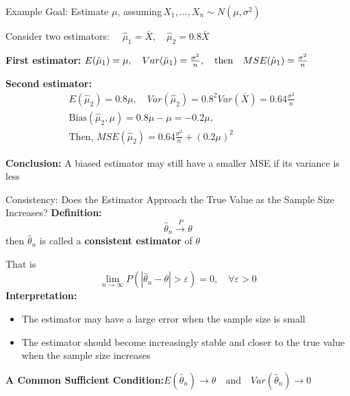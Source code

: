 \documentclass[aspectratio=169,12pt]{beamer}
\begin{document}
\begin{frame}{Example}
    Goal: Estimate $\mu$, assuming\,$X_1, \dots,X_n \sim N(\mu, \sigma^2)$

    \vspace{0.5em}
    Consider two estimators: $\quad\hat{\mu}_1=\bar X, \quad\hat{\mu}_2=0.8\bar X$

    \vspace{0.5em}
    \textbf{First estimator:} $E(\hat{\mu}_1)=\mu, \quad Var(\hat{\mu}_1)=\frac{\sigma^2}{n}, \quad\text{then\quad} MSE(\hat{\mu}_1)=\frac{\sigma^2}{n}$

    \vspace{0.5em}
    \textbf{Second estimator:}
    \vspace{-0.8em}
    \begin{align*}
    &E(\hat{\mu}_2)=0.8\mu, \quad Var(\hat{\mu}_2)=0.8^2 Var(\bar X)=0.64\frac{\sigma^2}{n}\\
    &\mathrm{Bias}(\hat{\mu}_2, \mu)=0.8\mu-\mu=-0.2\mu, \\
    &\text{Then},\,  MSE(\hat{\mu}_2)=0.64\frac{\sigma^2}{n}+(0.2\mu)^2
    \end{align*}

    \textbf{Conclusion:}
    A biased estimator may still have a smaller MSE if its variance is less
\end{frame}

\begin{frame}{Consistency: Does the Estimator Approach the True Value as the Sample Size Increases?}
    \textbf{Definition:}
    $$\hat{\theta}_n \xrightarrow{P} \theta$$
    then $\hat{\theta}_n$ is called a \textbf{consistent estimator} of $\theta$

    \vspace{0.8em}
    That is
    \vspace{-1.2em}
    $$\lim_{n\to\infty} P(|\hat{\theta}_n-\theta|>\varepsilon)=0,\quad \forall \varepsilon>0$$
    \textbf{Interpretation:}
    \begin{itemize}
        \item The estimator may have a large error when the sample size is small
        \item The estimator should become increasingly stable and closer to the true value when the sample size increases 
    \end{itemize}

    \vspace{0.8em}
    \textbf{A Common Sufficient Condition:}\quad $E(\hat{\theta}_n)\to \theta\quad\text{and}\quad Var(\hat{\theta}_n)\to 0$
\end{frame}
\end{document}
